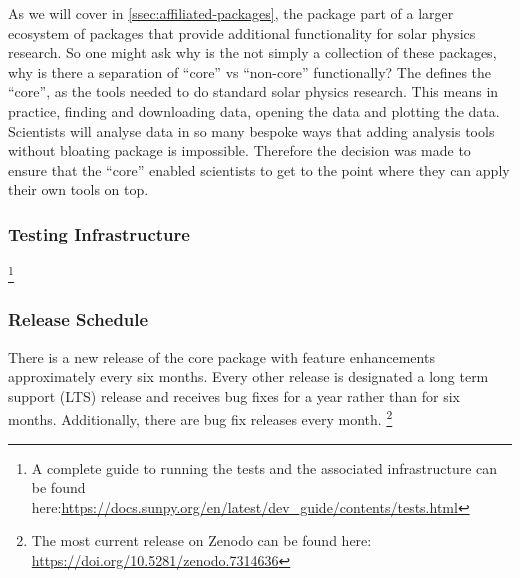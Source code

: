 As we will cover in \ref{ssec:affiliated-packages}, the \sunpypkg package part of a larger ecosystem of packages that provide additional functionality for solar physics research.
So one might ask why is the \sunpypkg not simply a collection of these packages, why is there a separation of \enquote{core} vs \enquote{non-core} functionally?
The \sunpyproj defines the \enquote{core}, as the tools needed to do standard solar physics research.
This means in practice, finding and downloading data, opening the data and plotting the data.
Scientists will analyse data in so many bespoke ways that adding analysis tools without bloating \sunpypkg package is impossible.
Therefore the decision was made to ensure that the \enquote{core} enabled scientists to get to the point where they can apply their own tools on top.

\subsubsection{Testing Infrastructure}
\label{sssec:testing-infrastructure}

\footnote{A complete guide to running the tests and the associated infrastructure can be found here:\url{https://docs.sunpy.org/en/latest/dev_guide/contents/tests.html}}

\subsubsection{Release Schedule}
\label{sssec:release-schedule}

There is a new release of the core package with feature enhancements approximately every six months.
Every other release is designated a long term support (LTS) release and receives bug fixes for a year rather than for six months.
Additionally, there are bug fix releases every month.
\footnote{The most current release on Zenodo can be found here: \url{https://doi.org/10.5281/zenodo.7314636}}


